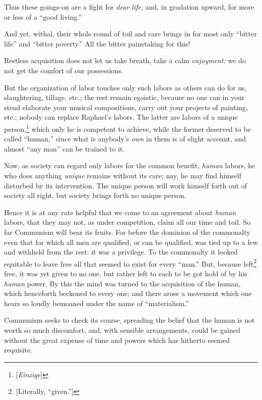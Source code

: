 Thus these goings-on are a fight for \textit{dear life}, and, in gradation 
upward, for more or less of a ``good living.''

And yet, withal, their whole round of toil and care brings in for most only 
``bitter life'' and ``bitter poverty.'' All the bitter painstaking for 
this!

Restless acquisition does not let us take breath, take a calm 
\textit{enjoyment:} we do not get the comfort of our possessions.

But the organization of labor touches only such labors as others can do for 
us, slaughtering, tillage, etc.; the rest remain egoistic, because no one can 
in your stead elaborate your musical compositions, carry out your projects of 
painting, etc.; nobody can replace Raphael's labors. The latter are labors of 
a unique person,\footnote{[\textit{Einzige}]} which only he is competent to 
achieve, while the former deserved to be called ``human,'' since what is 
anybody's \textit{own} in them is of slight account, and almost ``any man'' 
can be trained to it.

Now, as society can regard only labors for the common benefit, \textit{human} 
labors, he who does anything \textit{unique} remains without its care; nay, he 
may find himself disturbed by its intervention. The unique person will work 
himself forth out of society all right, but society brings forth no unique 
person.

Hence it is at any rate helpful that we come to an agreement about 
\textit{human} labors, that they may not, as under competition, claim all our 
time and toil. So far Communism will bear its fruits. For before the dominion 
of the commonalty even that for which all men are qualified, or can be 
qualified, was tied up to a few and withheld from the rest: it was a 
privilege. To the commonalty it looked equitable to leave free all that seemed 
to exist for every ``man.'' But, because left\footnote{[Literally, 
``given.'']} free, it was yet given to no one, but rather left to each to be 
got hold of by his \textit{human} power. By this the mind was turned to the 
acquisition of the human, which henceforth beckoned to every one; and there 
arose a movement which one hears so loudly bemoaned under the name of 
``materialism.''

Communism seeks to check its course, spreading the belief that the human is 
not worth so much discomfort, and, with sensible arrangements, could be gained 
without the great expense of time and powers which has hitherto seemed 
requisite.

